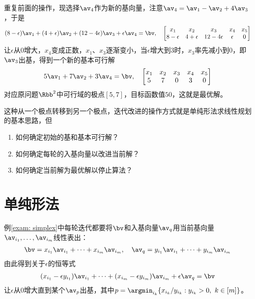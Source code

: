 \documentclass{ctexart}
\begin{document}
\begin{example}
    重复前面的操作，现选择$\av_4$作为新的基向量，注意$\av_4 = \av_1 - \av_2 + 4 \av_3$，于是
    \begin{align*}
        (8 - \epsilon) \av_1 + (4 + \epsilon) \av_2 + (12 - 4 \epsilon) \av_3 + \epsilon \av_4 = \bv, \quad
        \begin{bmatrix}
            x_1          & x_2          & x_3             & x_4      & x_5 \\
            8 - \epsilon & 4 + \epsilon & 12 - 4 \epsilon & \epsilon & 0
        \end{bmatrix}
    \end{align*}
    让$\epsilon$从$0$增大，$x_4$变成正数，$x_1$、$x_3$逐渐变小，当$\epsilon$增大到$3$时，$x_3$率先减小到$0$，即$\av_3$出基，得到一个新的基本可行解
    \begin{align*}
        5 \av_1 + 7 \av_2 + 3 \av_4 = \bv, \quad
        \begin{bmatrix}
            x_1 & x_2 & x_3 & x_4 & x_5 \\
            5   & 7   & 0   & 3   & 0
        \end{bmatrix}
    \end{align*}
    对应原问题$\Rbb^2$中可行域的极点$[5,7]$，目标函数值$50$，这就是最优解。
\end{example}

这种从一个极点转移到另一个极点，迭代改进的操作方式就是单纯形法求线性规划的基本思路，但
\begin{enumerate}
    \item 如何确定初始的基和基本可行解？
    \item 如何确定每轮的入基向量以改进当前解？
    \item 如何确定当前解为最优解以停止算法？
\end{enumerate}

\section{单纯形法}

例\ref{exam: simplex}中每轮迭代都要将$\bv$和入基向量$\av_q$用当前基向量$\av_{i_1}, \ldots, \av_{i_m}$线性表出：
\begin{align*}
    \bv = x_{i_1} \av_{i_1} + \cdots + x_{i_m} \av_{i_m}, \quad \av_q = y_{i_1} \av_{i_1} + \cdots + y_{i_m} \av_{i_m}
\end{align*}
由此得到关于$\epsilon$的恒等式
\begin{align*}
    (x_{i_1} - \epsilon y_{i_1}) \av_{i_1} + \cdots + (x_{i_m} - \epsilon y_{i_m}) \av_{i_m} + \epsilon \av_q = \bv
\end{align*}
让$\epsilon$从$0$增大直到某个$\av_p$出基，其中$p = \argmin_{i_k} \{ x_{i_k} / y_{i_k} : y_{i_k} > 0, ~ k \in [m] \}$。
\end{document}
